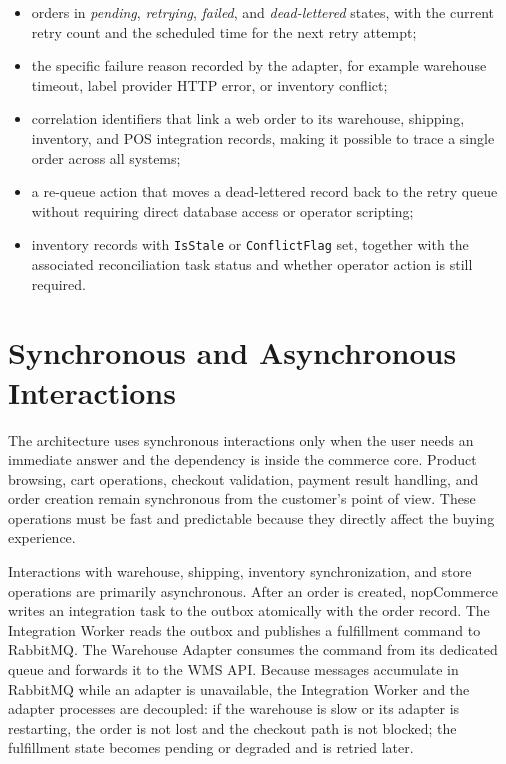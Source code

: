 \begin{itemize}
    \item orders in \textit{pending}, \textit{retrying}, \textit{failed}, and
    \textit{dead-lettered} states, with the current retry count and the scheduled time for
    the next retry attempt;
    \item the specific failure reason recorded by the adapter, for example warehouse
    timeout, label provider HTTP error, or inventory conflict;
    \item correlation identifiers that link a web order to its warehouse, shipping, inventory,
    and POS integration records, making it possible to trace a single order across all systems;
    \item a re-queue action that moves a dead-lettered record back to the retry queue without
    requiring direct database access or operator scripting;
    \item inventory records with \texttt{IsStale} or \texttt{ConflictFlag} set, together with
    the associated reconciliation task status and whether operator action is still required.
\end{itemize}

\section{Synchronous and Asynchronous Interactions}

The architecture uses synchronous interactions only when the user needs an immediate answer and
the dependency is inside the commerce core. Product browsing, cart operations, checkout
validation, payment result handling, and order creation remain synchronous from the customer's
point of view. These operations must be fast and predictable because they directly affect the
buying experience.

Interactions with warehouse, shipping, inventory synchronization, and store operations are
primarily asynchronous. After an order is created, nopCommerce writes an integration task to the outbox atomically
with the order record. The Integration Worker reads the outbox and publishes a fulfillment
command to RabbitMQ. The Warehouse Adapter consumes the command from its dedicated queue and
forwards it to the WMS API. Because messages accumulate in RabbitMQ while an adapter is
unavailable, the Integration Worker and the adapter processes are decoupled: if the warehouse
is slow or its adapter is restarting, the order is not lost and the checkout path is not
blocked; the fulfillment state becomes pending or degraded and is retried later.

